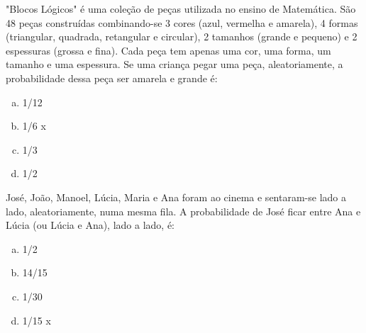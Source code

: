 \item  "Blocos Lógicos" é uma coleção de peças utilizada no ensino de Matemática. São 48 peças construídas combinando-se 3 cores (azul, vermelha e amarela), 4 formas (triangular, quadrada, retangular e circular), 2 tamanhos (grande e pequeno) e 2 espessuras (grossa e fina). Cada peça tem apenas uma cor, uma forma, um tamanho e uma espessura. Se uma criança pegar uma peça, aleatoriamente, a probabilidade dessa peça ser amarela e grande é:
\begin{multicols}{5}
\begin{enumerate}[a)]
	\item 1/12
	\item 1/6  x
	\item 1/3
	\item 1/2
\end{enumerate}
\end{multicols}

\item José, João, Manoel, Lúcia, Maria e Ana foram ao cinema e sentaram-se lado a lado, aleatoriamente, numa mesma fila. A probabilidade de José ficar entre Ana e Lúcia (ou Lúcia e Ana), lado a lado, é:
\begin{multicols}{5}
\begin{enumerate}[a)]
	\item 1/2
	\item 14/15
	\item 1/30
	\item 1/15  x
\end{enumerate}
\end{multicols}

	
		
	